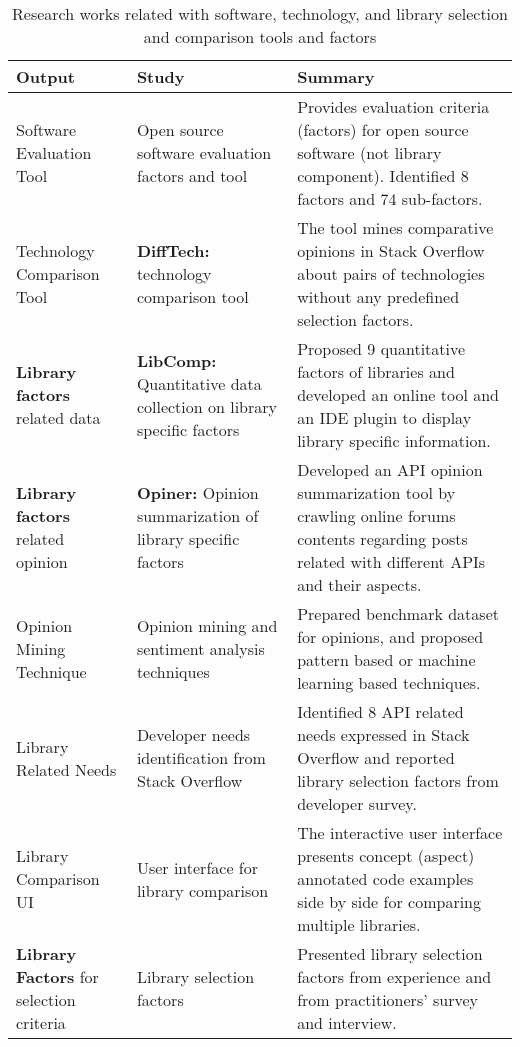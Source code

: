 \begin{table*}[]
    \centering
    \caption{Research works related with software, technology, and library selection and comparison tools and factors}
    \begin{tabular}{p{3cm}p{4cm}p{10cm}}
    \toprule
    \textbf{Output} & \textbf{Study} & \textbf{Summary} \\ 
    \midrule
    Software Evaluation Tool & Open source software evaluation factors and tool \cite{wasserman2017osspal,
    li2022exploring} & Provides evaluation criteria (factors) for open source software (not library component). Identified 8 factors and 74 sub-factors. \\ 
    Technology Comparison Tool & \textbf{DiffTech:} technology comparison tool \cite{huang2018tell, wang2020difftech, wang2021difftech} & The tool mines comparative opinions in Stack Overflow about pairs of technologies without any predefined selection factors. \\ 
    \textbf{Library factors} related data & \textbf{LibComp:} Quantitative data collection on library specific factors \cite{de2018library, de2018empirical, el2020libcomp} & Proposed 9 quantitative factors of libraries and developed an online tool and an IDE plugin to display library specific information. \\ 
    \textbf{Library factors} related opinion & \textbf{Opiner:} Opinion summarization of library specific factors \cite{uddin2017automatic, uddin2017opiner} & Developed an API opinion summarization tool by crawling online forums contents regarding posts related with different APIs and their aspects. \\ 
    Opinion Mining Technique & Opinion mining and sentiment analysis techniques \cite{lin2019pattern, uddin2019automatic, uddin2022empirical} & Prepared benchmark dataset for opinions, and proposed pattern based or machine learning based techniques. \\ 
    Library Related Needs & Developer needs identification from Stack Overflow \cite{liu2021api, uddin2019understanding} & Identified 8 API related needs expressed in Stack Overflow and reported library selection factors from developer survey. \\ 
    Library Comparison UI & User interface for library comparison \cite{yan2022concept} & The interactive user interface presents concept (aspect) annotated code examples side by side for comparing multiple libraries. \\ 
    \textbf{Library Factors} for selection criteria & Library selection factors \cite{spinellis2019select, larios2020selecting} & Presented library selection factors from experience and from practitioners' survey and interview. \\ 
    
    
    \bottomrule
    \end{tabular}
    \label{tab:related-works-summary}
\end{table*}